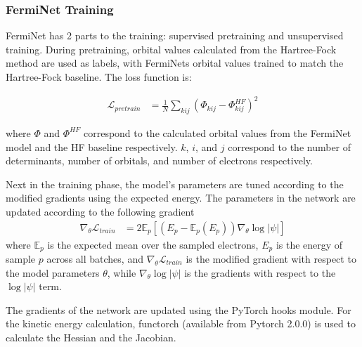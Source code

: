\documentclass[letterpaper]{article} %
\begin{document}
\subsubsection{FermiNet Training}
FermiNet has 2 parts to the training: supervised pretraining and unsupervised training.
During pretraining, orbital values calculated from the Hartree-Fock method are used as labels, with FermiNets orbital values trained to match the Hartree-Fock baseline. The loss function is:

\begin{align}
\mathcal{L}_{pretrain} &= \frac{1}{N} \sum_{kij}^{} \left( \Phi_{kij} - {\Phi_{kij}^{HF   }} \right)^{2}
\end{align}

\noindent where \(\Phi\) and \({\Phi_{}^{HF}}\) correspond to the calculated orbital values from the FermiNet model and the HF baseline respectively. $k$, $i$, and $j$ correspond to the number of determinants, number of orbitals, and number of electrons respectively.

Next in the training phase, the model's parameters are tuned according to the modified gradients using the expected energy. The parameters in the network are updated according to the following gradient
\begin{align}
\nabla_{\theta}\mathcal{L}_{train} &= 2\mathbb{E}_p \left[ \left( E_p - \mathbb{E}_p(E_p) \right)\nabla_{\theta}\log |\psi| \right]
\end{align}
\noindent where $\mathbb{E}_p$ is the expected mean over the sampled electrons, $E_p$ is the energy of sample $p$ across all batches, and \(\nabla_{\theta}\mathcal{L}_{train}\) is the modified gradient with respect to the model parameters \(\theta\), while \(\nabla_{\theta}\log |\psi|\) is the gradients with respect to the \(\log |\psi|\) term.

The gradients of the network are updated using the PyTorch hooks module. For the kinetic energy calculation, functorch \cite{functorch2021} (available from Pytorch 2.0.0) is used to calculate the Hessian and the Jacobian.
\end{document}

